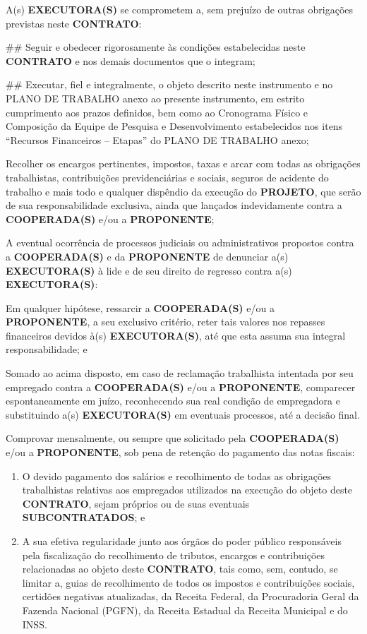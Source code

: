 
A(s) \textbf{EXECUTORA(S)} se comprometem a, sem prejuízo de outras obrigações previstas neste \textbf{CONTRATO}:

## Seguir e obedecer rigorosamente às condições estabelecidas neste \textbf{CONTRATO} e nos demais documentos que o integram;

## Executar, fiel e integralmente, o objeto descrito neste instrumento e no PLANO DE TRABALHO anexo ao presente instrumento, em estrito cumprimento aos prazos definidos, bem como ao Cronograma Físico e Composição da Equipe de Pesquisa e Desenvolvimento estabelecidos nos itens “Recursos Financeiros – Etapas” do PLANO DE TRABALHO anexo;

\xx Recolher os encargos pertinentes, impostos, taxas e arcar com todas as obrigações trabalhistas, contribuições previdenciárias e sociais, seguros de acidente do trabalho e mais todo e qualquer dispêndio da execução do \textbf{PROJETO}, que serão de sua responsabilidade exclusiva, ainda que lançados indevidamente contra a \textbf{COOPERADA(S)} e/ou a \textbf{PROPONENTE};

\xx A eventual ocorrência de processos judiciais ou administrativos propostos contra a \textbf{COOPERADA(S)} e da \textbf{PROPONENTE} de denunciar a(s) \textbf{EXECUTORA(S)} à lide e de seu direito de regresso contra a(s) \textbf{EXECUTORA(S)}:

\xxx  Em qualquer hipótese, ressarcir a \textbf{COOPERADA(S)} e/ou a \textbf{PROPONENTE}, a seu exclusivo critério, reter tais valores nos repasses financeiros devidos à(s) \textbf{EXECUTORA(S)}, até que esta assuma sua integral responsabilidade; e

\xxx  Somado ao acima disposto, em caso de reclamação trabalhista intentada por seu empregado contra a \textbf{COOPERADA(S)} e/ou a \textbf{PROPONENTE}, comparecer espontaneamente em juízo, reconhecendo sua real condição de empregadora e substituindo a(s) \textbf{EXECUTORA(S)} em eventuais processos, até a decisão final.

\xx Comprovar mensalmente, ou sempre que solicitado pela \textbf{COOPERADA(S)} e/ou a \textbf{PROPONENTE}, sob pena de retenção do pagamento das notas fiscais:

\begin{enumerate}[label=\alph*)]
    \item O devido pagamento dos salários e recolhimento de todas as obrigações trabalhistas relativas aos empregados utilizados na execução do objeto deste \textbf{CONTRATO}, sejam próprios ou de suas eventuais \textbf{SUBCONTRATADOS}; e
    \item A sua efetiva regularidade junto aos órgãos do poder público responsáveis pela fiscalização do recolhimento de tributos, encargos e contribuições relacionadas ao objeto deste \textbf{CONTRATO}, tais como, sem, contudo, se limitar a, guias de recolhimento de todos os impostos e contribuições sociais, certidões negativas atualizadas, da Receita Federal, da Procuradoria Geral da Fazenda Nacional (PGFN), da Receita Estadual da Receita Municipal e do INSS.
\end{enumerate}

